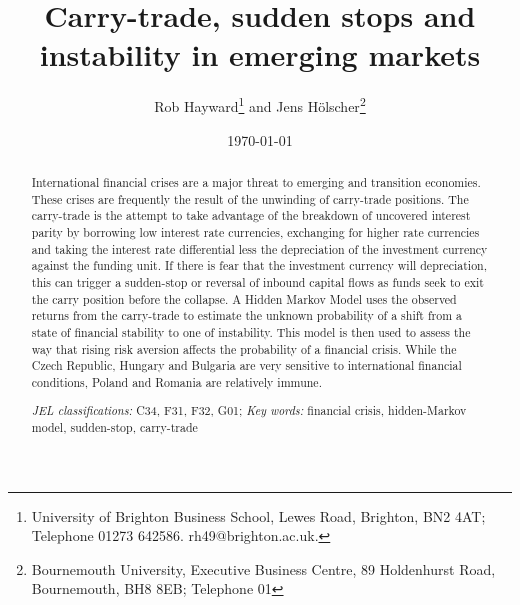 \documentclass[12pt, a4paper, oneside]{article}\usepackage[]{graphicx}\usepackage[]{color}
\begin{document}
\title{Carry-trade, sudden stops and instability in emerging markets}
\author{Rob Hayward\footnote{University of Brighton Business School, Lewes Road, Brighton, BN2 4AT; Telephone 01273 642586.  rh49@brighton.ac.uk.} and Jens H\"{o}lscher\footnote{Bournemouth University, Executive Business Centre, 89 Holdenhurst Road, Bournemouth, BH8 8EB; Telephone 01}}  
\date{\today}
\maketitle
\begin{abstract}
International financial crises are a major threat to emerging and transition economies.  These crises are frequently the result of the unwinding of carry-trade positions.  The carry-trade is the attempt to take advantage of the breakdown of uncovered interest parity by borrowing low interest rate currencies, exchanging for higher rate currencies and taking the interest rate differential less the depreciation of the investment currency against the funding unit.  If there is fear that the investment currency will depreciation, this can trigger a sudden-stop or reversal of inbound capital flows as funds seek to exit the carry position before the collapse.  A Hidden Markov Model uses the observed returns from the carry-trade to estimate the unknown probability of a shift from a state of financial stability to one of instability. This model is then used to assess the way that rising risk aversion affects the probability of a financial crisis. While the Czech Republic,  Hungary and Bulgaria are very sensitive to international financial conditions, Poland and Romania are relatively immune.  

\emph{JEL classifications:} C34, F31, F32, G01; 
\emph{Key words:} financial crisis, hidden-Markov model, sudden-stop, carry-trade


\end{abstract}
\end{document}
